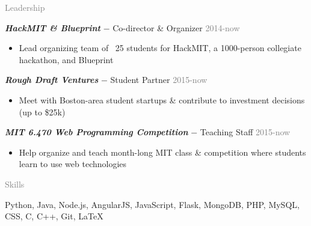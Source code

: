 \documentclass[11pt]{article}
\newcommand{\rsection}[1]{\vspace{1.5em}\textcolor{gray}{\Large \robotoslab #1}\vspace{0.5em}}
\newcommand{\bt}[1]{\textit{\textbf{#1}}} %
\newcommand{\gap}[0]{\vspace{0.5em}} %
\newcommand{\dash}[0]{ $-$ } %
\newcommand{\gray}[1]{\textcolor{gray}{#1}}
\begin{document}
\rsection{Leadership}

\bt{HackMIT \& Blueprint}\dash Co-director \& Organizer \hfill \gray{2014-now}

\begin{itemize}
\item Lead organizing team of ~25 students for HackMIT, a 1000-person collegiate hackathon, and Blueprint
\end{itemize}

\gap

\bt{Rough Draft Ventures}\dash Student Partner \hfill \gray{2015-now}

\begin{itemize}
\item Meet with Boston-area student startups \& contribute to investment decisions (up to \$25k)
\end{itemize}

\gap

\bt{MIT 6.470 Web Programming Competition}\dash Teaching Staff \hfill \gray{2015-now}

\begin{itemize}
\item Help organize and teach month-long MIT class \& competition where students learn to use web technologies
\end{itemize}

\rsection{Skills}

Python, Java, Node.js, AngularJS, JavaScript, Flask, MongoDB, PHP, MySQL, CSS, C, C++, Git, {\selectfont\LaTeX}
\end{document}
